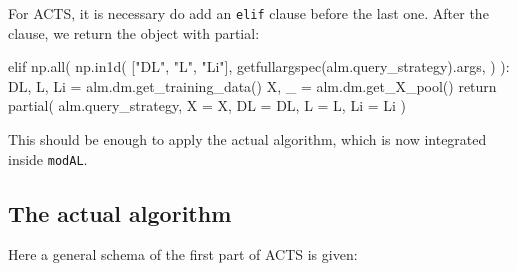 For ACTS, it is necessary do add an \texttt{elif} clause before the last one. After 
the clause, we return the object with partial:
\begin{python}
    elif np.all(
        np.in1d(
            ["DL", "L", "Li"],
            getfullargspec(alm.query_strategy).args,
        )
    ):
        DL, L, Li = alm.dm.get_training_data()
        X, _ = alm.dm.get_X_pool() 
        return partial(
            alm.query_strategy,
            X = X,
            DL = DL, 
            L = L, 
            Li = Li
        )
\end{python}

This should be enough to apply the actual algorithm, which is now integrated inside
\texttt{modAL}.

\subsection{The actual algorithm}
Here a general schema of the first part of ACTS is given:
